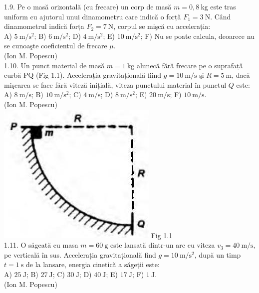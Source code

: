 \documentclass[10pt]{article}
\begin{document}
1.9. Pe o masă orizontală (cu frecare) un corp de masă $m=0,8 \mathrm{~kg}$ este tras uniform cu ajutorul unui dinamometru care indică o forță $F_{1}=3 \mathrm{~N}$. Când dinamometrul indică forța $F_{2}=7 \mathrm{~N}$, corpul se mişcă cu accelerația:\\ A) $5 \mathrm{~m} / \mathrm{s}^{2}$; B) $6 \mathrm{~m} / \mathrm{s}^{2}$; D) $4 \mathrm{~m} / \mathrm{s}^{2}$; E) $10 \mathrm{~m} / \mathrm{s}^{2}$; F) Nu se poate calcula, deoarece nu se cunoaşte coeficientul de frecare $\mu$.\\ (Ion M. Popescu)\\

1.10. Un punct material de masă $m=1 \mathrm{~kg}$ alunecă fără frecare pe o suprafață curbă PQ (Fig 1.1). Accelerația gravitațională fiind $g=10 \mathrm{~m} / \mathrm{s}$ şi $R=5 \mathrm{~m}$, dacă mişcarea se face fără viteză inițială, viteza punctului material în punctul $Q$ este:\\ A) $8 \mathrm{~m} / \mathrm{s}$; B) $10 \mathrm{~m} / \mathrm{s}^{2}$; C) $4 \mathrm{~m} / \mathrm{s}$; D) $8 \mathrm{~m} / \mathrm{s}^{2}$; E) $20 \mathrm{~m} / \mathrm{s}$; F) $10 \mathrm{~m} / \mathrm{s}$.\\ (Ion M. Popescu)\\ \includegraphics[max width=\textwidth, center]{2025_07_01_5b3ff9fa0d508c8e9f17g-004} Fig 1.1\\

1.11. O săgeată cu masa $m=60 \mathrm{~g}$ este lansată dintr-un arc cu viteza $v_{3}=40 \mathrm{~m} / \mathrm{s}$, pe verticală în sus. Accelerația gravitațională find $g=10 \mathrm{~m} / \mathrm{s}^{2}$, după un timp $t=1 \mathrm{~s}$ de la lansare, energia cinetică a săgeții este:\\ A) $25 \mathrm{~J}$; B) $27 \mathrm{~J}$; C) $30 \mathrm{~J}$; D) $40 \mathrm{~J}$; E) $17 \mathrm{~J}$; F) $1 \mathrm{~J}$.\\ (Ion M. Popescu)
\end{document}
